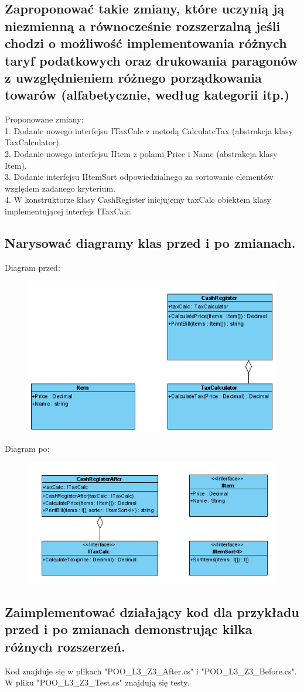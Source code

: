 \documentclass[10pt, a4paper]{article}
\begin{document}
\subsection*{Zaproponować takie zmiany, które uczynią ją niezmienną a równocześnie rozszerzalną jeśli chodzi o możliwość implementowania różnych taryf podatkowych oraz drukowania paragonów z uwzględnieniem różnego porządkowania towarów (alfabetycznie, według kategorii itp.)}
Proponowane zmiany: \\
1. Dodanie nowego interfejsu ITaxCalc z metodą CalculateTax (abstrakcja klasy TaxCalculator). \\
2. Dodanie nowego interfejsu IItem z polami Price i Name (abstrakcja klasy Item). \\
3. Dodanie interfejsu IItemSort odpowiedzialnego za sortowanie elementów względem zadanego kryterium. \\
4. W konstruktorze klasy CashRegister inicjujemy taxCalc obiektem klasy implementującej interfejs ITaxCalc.
\subsection*{Narysować diagramy klas przed i po zmianach.}
Diagram przed:
\begin{figure}[H]
\includegraphics{Diagram_before}
\end{figure}
Diagram po:
\begin{figure}[H]
\includegraphics{Diagram_after}
\end{figure}
\subsection*{Zaimplementować działający kod dla przykładu przed i po zmianach demonstrując kilka różnych rozszerzeń.}
Kod znajduje się w plikach "POO\_L3\_Z3\_After.cs" i "POO\_L3\_Z3\_Before.cs". W pliku "POO\_L3\_Z3\_Test.cs" znajdują się testy.
\end{document}
